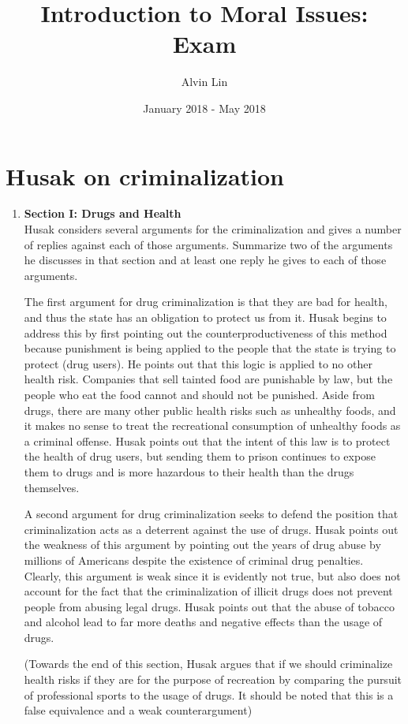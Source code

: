 \documentclass{article}
\title{Introduction to Moral Issues: Exam}
\author{Alvin Lin}
\date{January 2018 - May 2018}
\begin{document}
\maketitle

\section*{Husak on criminalization}

\begin{enumerate}
  \item \textbf{Section I: Drugs and Health} \\
  Husak considers several arguments for the criminalization and gives a number of replies against each of those arguments. Summarize two of the arguments he discusses in that section and at least one reply he gives to each of those arguments.
  \par The first argument for drug criminalization is that they are bad for health, and thus the state has an obligation to protect us from it. Husak begins to address this by first pointing out the counterproductiveness of this method because punishment is being applied to the people that the state is trying to protect (drug users). He points out that this logic is applied to no other health risk. Companies that sell tainted food are punishable by law, but the people who eat the food cannot and should not be punished. Aside from drugs, there are many other public health risks such as unhealthy foods, and it makes no sense to treat the recreational consumption of unhealthy foods as a criminal offense. Husak points out that the intent of this law is to protect the health of drug users, but sending them to prison continues to expose them to drugs and is more hazardous to their health than the drugs themselves.
  \par A second argument for drug criminalization seeks to defend the position that criminalization acts as a deterrent against the use of drugs. Husak points out the weakness of this argument by pointing out the years of drug abuse by millions of Americans despite the existence of criminal drug penalties. Clearly, this argument is weak since it is evidently not true, but also does not account for the fact that the criminalization of illicit drugs does not prevent people from abusing legal drugs. Husak points out that the abuse of tobacco and alcohol lead to far more deaths and negative effects than the usage of drugs.
  \par (Towards the end of this section, Husak argues that if we should criminalize health risks if they are for the purpose of recreation by comparing the pursuit of professional sports to the usage of drugs. It should be noted that this is a false equivalence and a weak counterargument)

\end{enumerate}
\end{document}
